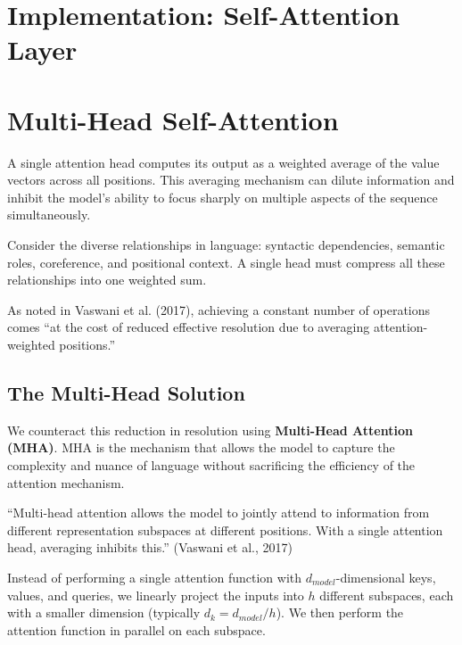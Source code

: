 \documentclass{article}
\begin{document}
\section{Implementation: Self-Attention Layer}


\section{Multi-Head Self-Attention}
A single attention head computes its output as a weighted average of the value vectors across all positions. This averaging mechanism can dilute information and inhibit the model's ability to focus sharply on multiple aspects of the sequence simultaneously.

Consider the diverse relationships in language: syntactic dependencies, semantic roles, coreference, and positional context. A single head must compress all these relationships into one weighted sum.

\begin{tcolorbox}[colback=gray!10!white, colframe=gray!50!black, title=The Resolution Trade-off]
As noted in Vaswani et al. (2017), achieving a constant number of operations comes ``at the cost of reduced effective resolution due to averaging attention-weighted positions.''
\end{tcolorbox}

\subsection{The Multi-Head Solution}

We counteract this reduction in resolution using \textbf{Multi-Head Attention (MHA)}. MHA is the mechanism that allows the model to capture the complexity and nuance of language without sacrificing the efficiency of the attention mechanism.

\begin{tcolorbox}[colback=blue!5!white, colframe=blue!75!black, title={Different Subspaces, Joint Attention}]
``Multi-head attention allows the model to jointly attend to information from different representation subspaces at different positions. With a single attention head, averaging inhibits this.'' (Vaswani et al., 2017)
\end{tcolorbox}

Instead of performing a single attention function with $d_{model}$-dimensional keys, values, and queries, we linearly project the inputs into $h$ different subspaces, each with a smaller dimension (typically $d_k = d_{model}/h$). We then perform the attention function in parallel on each subspace.
\end{document}
